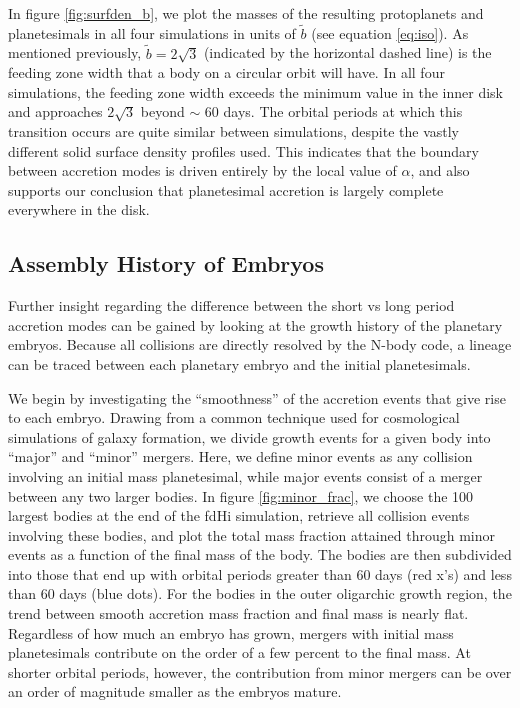 \documentclass[twocolumn,linenumbers]{aastex63}
\begin{document}
In figure \ref{fig:surfden_b}, we plot the masses of the resulting protoplanets and planetesimals in all four simulations in units of $
\tilde{b}$ (see equation \ref{eq:iso}). 
As mentioned previously, $\tilde{b} = 2 \sqrt{3}$ (indicated by the horizontal dashed line) is the  
feeding zone width that a body on a circular orbit will have. In all four simulations, the feeding zone width exceeds the 
minimum value in the inner disk and approaches $2 \sqrt{3}$ beyond $\sim$ 60 days. The orbital periods at which this transition 
occurs are quite similar between simulations, despite the vastly different solid surface density profiles used. This indicates that 
the boundary between accretion modes is driven entirely by the local value of $\alpha$, and also supports our 
conclusion that planetesimal accretion is largely complete everywhere in the disk.

\subsection{Assembly History of Embryos}\label{sec:assembly}

Further insight regarding the difference between the short vs long period accretion modes can be gained by looking at the 
growth history of the planetary embryos. Because all collisions are directly resolved by the N-body code, a lineage can be 
traced between each planetary embryo and the initial planetesimals.

We begin by investigating the ``smoothness'' of the accretion events
that give rise to each embryo. Drawing from a common technique used
for cosmological simulations of galaxy formation, we divide growth events for
a given body into ``major'' and ``minor'' mergers. Here, we define minor events as any collision involving an initial mass 
planetesimal, while major events consist of a merger between any two larger bodies. In figure \ref{fig:minor_frac}, we choose the 
100 largest bodies at the end of the fdHi simulation, retrieve all collision events involving these bodies, and plot the total mass 
fraction attained through minor events as a function of the final mass of the body. The bodies are then subdivided into those that 
end up with orbital periods greater than 60 days (red x's) and less than 60 days (blue dots). For the bodies in the outer oligarchic 
growth region, the trend between smooth accretion mass fraction and final mass is nearly flat. Regardless of how much an 
embryo has grown, mergers with initial mass planetesimals contribute on the order of a few percent to the final mass.
At shorter orbital periods, however, the contribution from minor mergers can be over an order of magnitude smaller as the 
embryos mature.
\end{document}
